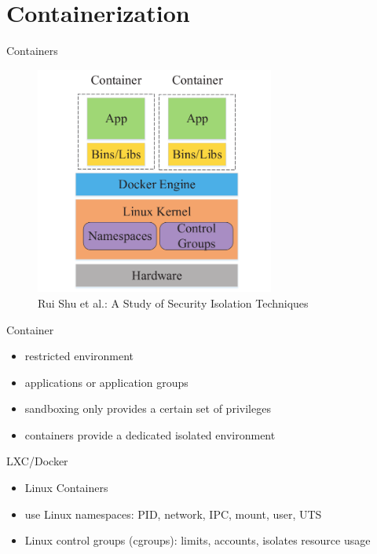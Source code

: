 \documentclass{curs}
\begin{document}
\section{Containerization}

\begin{frame}{Containers}
  \begin{figure}
    \centering
    \includegraphics[width=0.7\textwidth]{img/container} \\
    {\tiny Rui Shu et al.: A Study of Security Isolation Techniques}
  \end{figure}
\end{frame}

\begin{frame}{Container}
  \begin{itemize}
    \item restricted environment
    \item applications or application groups
    \item sandboxing only provides a certain set of privileges
    \item containers provide a dedicated isolated environment
  \end{itemize}
\end{frame}

\begin{frame}{LXC/Docker}
  \begin{itemize}
    \item Linux Containers
    \item use Linux namespaces: PID, network, IPC, mount, user, UTS
    \item Linux control groups (cgroups): limits, accounts, isolates resource usage
  \end{itemize}
\end{frame}
\end{document}
